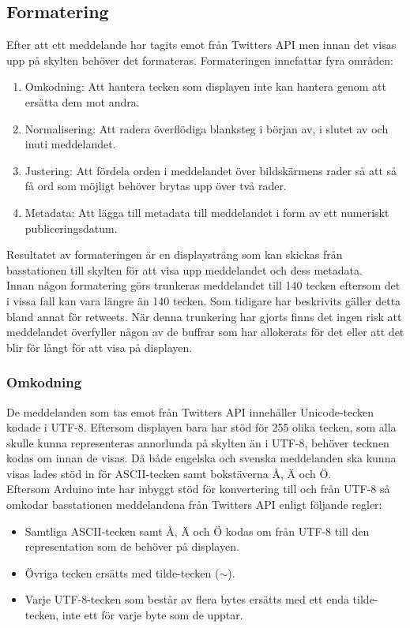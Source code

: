 \documentclass[a4paper,11pt]{article}
\begin{document}
\subsection{Formatering}
Efter att ett meddelande har tagits emot från Twitters API men innan det visas upp på skylten behöver det formateras. Formateringen innefattar fyra områden:
	\begin{enumerate}
    	\item Omkodning: Att hantera tecken som displayen inte kan hantera genom att ersätta dem mot andra.
    	\item Normalisering: Att radera överflödiga blanksteg i början av, i slutet av och inuti meddelandet.
    	\item Justering: Att fördela orden i meddelandet över bildskärmens rader så att så få ord som möjligt behöver brytas upp över två rader.
    	\item Metadata: Att lägga till metadata till meddelandet i form av ett numeriskt publiceringsdatum.
	\end{enumerate}

Resultatet av formateringen är en displaysträng som kan skickas från basstationen till skylten för att visa upp meddelandet och dess metadata.\\

Innan någon formatering görs trunkeras meddelandet till 140 tecken eftersom det i vissa fall kan vara längre än 140 tecken. Som tidigare har beskrivits gäller detta bland annat för retweets. När denna trunkering har gjorts finns det ingen risk att meddelandet överfyller någon av de buffrar som har allokerats för det eller att det blir för långt för att visa på displayen.

\subsubsection{Omkodning}
De meddelanden som tas emot från Twitters API innehåller Unicode-tecken kodade i UTF-8. Eftersom displayen bara har stöd för 255 olika tecken, som alla skulle kunna representeras annorlunda på skylten än i UTF-8, behöver tecknen kodas om innan de visas. Då både engelska och svenska meddelanden ska kunna visas lades stöd in för ASCII-tecken samt bokstäverna Å, Ä och Ö.\\

Eftersom Arduino inte har inbyggt stöd för konvertering till och från UTF-8 så omkodar basstationen meddelandena från Twitters API enligt följande regler:
	\begin{itemize}
    	\item Samtliga ASCII-tecken samt Å, Ä och Ö kodas om från UTF-8 till den representation som de behöver på displayen.
    	\item Övriga tecken ersätts med tilde-tecken ($\sim$).
    	\item Varje UTF-8-tecken som består av flera bytes ersätts med ett enda tilde-tecken, inte ett för varje byte som de upptar.
	\end{itemize}
\end{document}
